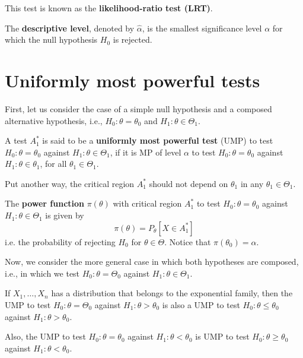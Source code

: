 \documentclass[12pt,a4paper]{report}
\begin{document}
This test is known as the \textbf{likelihood-ratio test (LRT)}.

\begin{definition}
    The \textbf{descriptive level}, denoted by $\hat{\alpha}$, is the smallest significance level $\alpha$ for which the null hypothesis $H_0$ is rejected. 
\end{definition}

\section{Uniformly most powerful tests}

First, let us consider the case of a simple null hypothesis and a composed alternative hypothesis, i.e., $H_0: \theta = \theta_0$ and $H_1 : \theta \in \Theta_1$. 

\begin{definition}
    A test $A_1^\ast$ is said to be a \textbf{uniformly most powerful test} (UMP) to test $H_0: \theta = \theta_0$ against $H_1 : \theta \in \Theta_1$, if it is MP of level $\alpha$ to test $H_0: \theta = \theta_0$ against $H_1 : \theta \in \theta_1$, for all $\theta_1 \in \Theta_1$.
\end{definition}

Put another way, the critical region $A_1^\ast$ should not depend on $\theta_1$ in any $\theta_1 \in \Theta_1$.

\begin{definition}
    The \textbf{power function} $\pi(\theta)$ with critical region $A_1^\ast$ to test $H_0: \theta = \theta_0$ against $H_1 : \theta \in \Theta_1$ is given by 
    \[
        \pi(\theta) = P_\theta[X \in A_1^\ast]
    \]
    i.e. the probability of rejecting $H_0$ for $\theta \in \Theta$. Notice that $\pi(\theta_0) = \alpha$.
\end{definition}

Now, we consider the more general case in which both hypotheses are composed, i.e., in which we test $H_0: \theta = \Theta_0$ against $H_1 : \theta \in \Theta_1$.

\begin{theorem}
    If $X_1, \ldots, X_n$ has a distribution that belongs to the exponential family, then the UMP to test $H_0: \theta = \Theta_0$ against $H_1 : \theta > \theta_0$ is also a UMP to test $H_0: \theta \leq \theta_0$ against $H_1 : \theta > \theta_0$.
    
    Also, the UMP to test $H_0: \theta = \theta_0$ against $H_1 : \theta < \theta_0$ is UMP to test $H_0: \theta \geq \theta_0$ against $H_1 : \theta < \theta_0$.
\end{theorem}
\end{document}
